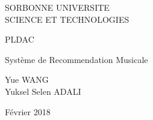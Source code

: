 \begin{titlepage}
    \begin{center}
    	\large
        \vspace{-0.5cm}
    	SORBONNE UNIVERSITE\\
        SCIENCE ET TECHNOLOGIES
        \vspace{3.0cm}
        
       
        PLDAC 
        
        
        Système de Recommendation Musicale 
        
        \vspace{1.5cm}
        
        Yue WANG\\
        Yuksel Selen ADALI\\
       
        \vspace{1.5cm}
      
\author{Yue \\Selen {}}
        \vfill
        Février 2018
       
    \end{center}
\end{titlepage}